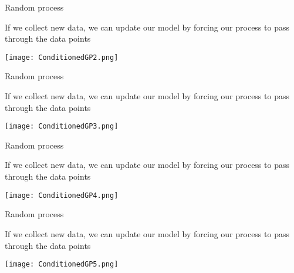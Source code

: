 \documentclass[9pt]{beamer}
\begin{document}
\begin{frame}[t]{Random process}

If we collect new data, we can update our model by forcing our process to pass through the data points

\begin{center}
\texttt{[image: ConditionedGP2.png]}
\end{center}

\end{frame}

\begin{frame}[t]{Random process}

If we collect new data, we can update our model by forcing our process to pass through the data points

\begin{center}
\texttt{[image: ConditionedGP3.png]}
\end{center}
\end{frame}

\begin{frame}[t]{Random process}

If we collect new data, we can update our model by forcing our process to pass through the data points

\begin{center}
\texttt{[image: ConditionedGP4.png]}
\end{center}

\end{frame}

\begin{frame}[t]{Random process}

If we collect new data, we can update our model by forcing our process to pass through the data points

\begin{center}
\texttt{[image: ConditionedGP5.png]}
\end{center}

\end{frame}
\end{document}

